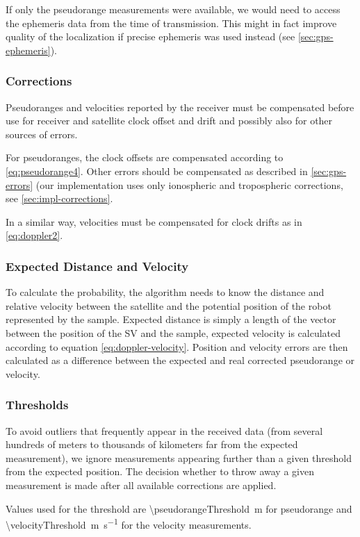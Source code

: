 If only the pseudorange measurements were available, we would need to access the
ephemeris data from the time of transmission.
This might in fact improve quality of the localization if precise ephemeris
was used instead (see \cref{sec:gps-ephemeris}).

\subsubsection{Corrections}
Pseudoranges and velocities reported by the receiver must be compensated before
use for receiver and satellite clock offset and drift and possibly also for other
sources of errors.

For pseudoranges, the clock offsets are compensated according to \cref{eq:pseudorange4}.
Other errors should be compensated as described in \cref{sec:gps-errors}
(our implementation uses only ionospheric and tropospheric corrections, see \cref{sec:impl-corrections}.

In a similar way, velocities must be compensated for clock drifts 
as in \eqref{eq:doppler2}.


\subsubsection{Expected Distance and Velocity}
To calculate the probability, the algorithm needs to know the distance and relative
velocity between the satellite and the potential position of the robot represented
by the sample.
Expected distance is simply a length of the vector between the position of the SV
and the sample, expected velocity is calculated according to equation \eqref{eq:doppler-velocity}.
Position and velocity errors are then calculated as a difference between the expected
and real corrected pseudorange or velocity.

\subsubsection{Thresholds}
To avoid outliers that frequently appear in the received data (from several hundreds
of meters to thousands of kilometers far from the expected measurement), we
ignore measurements appearing further than a given threshold from the expected position.
The decision whether to throw away a given measurement is made after all available corrections
are applied.

Values used for the threshold are \SI{\pseudorangeThreshold}{\meter} for pseudorange
and \SI{\velocityThreshold}{\meter\per\second} for the velocity measurements.

